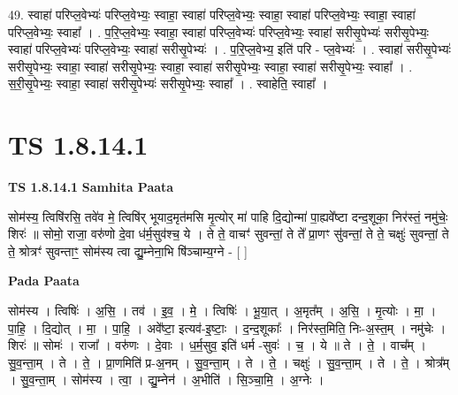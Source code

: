 \documentclass[17pt]{extarticle}
\begin{document}
49. स्वाहा॑ परिप्ल॒वेभ्यः॑ परिप्ल॒वेभ्यः॒ स्वाहा॒ स्वाहा॑ परिप्ल॒वेभ्यः॒ स्वाहा॒ स्वाहा॑ परिप्ल॒वेभ्यः॒ स्वाहा॒ स्वाहा॑ परिप्ल॒वेभ्यः॒ स्वाहा᳚ । . प॒रि॒प्ल॒वेभ्यः॒ स्वाहा॒ स्वाहा॑ परिप्ल॒वेभ्यः॑ परिप्ल॒वेभ्यः॒ स्वाहा॑ सरीसृ॒पेभ्यः॑ सरीसृ॒पेभ्यः॒ स्वाहा॑ परिप्ल॒वेभ्यः॑ परिप्ल॒वेभ्यः॒ स्वाहा॑ सरीसृ॒पेभ्यः॑ । . प॒रि॒प्ल॒वेभ्य॒ इति॑ परि - प्ल॒वेभ्यः॑ । . स्वाहा॑ सरीसृ॒पेभ्यः॑ सरीसृ॒पेभ्यः॒ स्वाहा॒ स्वाहा॑ सरीसृ॒पेभ्यः॒ स्वाहा॒ स्वाहा॑ सरीसृ॒पेभ्यः॒ स्वाहा॒ स्वाहा॑ सरीसृ॒पेभ्यः॒ स्वाहा᳚ । . स॒री॒सृ॒पेभ्यः॒ स्वाहा॒ स्वाहा॑ सरीसृ॒पेभ्यः॑ सरीसृ॒पेभ्यः॒ स्वाहा᳚ । . स्वाहेति॒ स्वाहा᳚ । \newline
\pagebreak
{}

\section{ TS 1.8.14.1 }

\textbf{TS 1.8.14.1 } \newline
\textbf{Samhita Paata} \newline

सोम॑स्य॒ त्विषि॑रसि॒ तवे॑व मे॒ त्विषि॑र् भूयाद॒मृत॑मसि मृ॒त्योर् मा॑ पाहि दि॒द्योन्मा॑ पा॒ह्यवे᳚ष्टा दन्द॒शूका॒ निर॑स्तं॒ नमु॑चेः॒ शिरः॑ ॥ सोमो॒ राजा॒ वरु॑णो दे॒वा ध॑र्म॒सुव॑श्च॒ ये । ते ते॒ वाचꣳ॑ सुवन्तां॒ ते ते᳚ प्रा॒णꣳ सु॑वन्तां॒ ते ते॒ चक्षुः॑ सुवन्तां॒ ते ते॒ श्रोत्रꣳ॑ सुवन्ताꣳ॒॒ सोम॑स्य त्वा द्यु॒म्नेना॒भि षि॑ञ्चाम्य॒ग्ने - [ ] \newline

\textbf{Pada Paata} \newline

सोम॑स्य । त्विषिः॑ । अ॒सि॒ । तव॑ । इ॒व॒ । मे॒ । त्विषिः॑ । भू॒या॒त् । अ॒मृत᳚म् । अ॒सि॒ । मृ॒त्योः । मा॒ । पा॒हि॒ । दि॒द्योत् । मा॒ । पा॒हि॒ । अवे᳚ष्टा॒ इत्यव॑-इ॒ष्टाः॒ । द॒न्द॒शूकाः᳚ । निर॑स्त॒मिति॒ निः-अ॒स्त॒म् । नमु॑चेः । शिरः॑ ॥ सोमः॑ । राजा᳚ । वरु॑णः । दे॒वाः । ध॒र्म॒सुव॒ इति॑ धर्म -सुवः॑ । च॒ । ये ॥ ते । ते॒ । वाच᳚म् । सु॒व॒न्ता॒म् । ते । ते॒ । प्रा॒णमिति॑ प्र-अ॒नम् । सु॒व॒न्ता॒म् । ते । ते॒ । चक्षुः॑ । सु॒व॒न्ता॒म् । ते । ते॒ । श्रोत्र᳚म् । सु॒व॒न्ता॒म् । सोम॑स्य । त्वा॒ । द्यु॒म्नेन॑ । अ॒भीति॑ । सि॒ञ्चा॒मि॒ । अ॒ग्नेः ।  \newline
\end{document}
